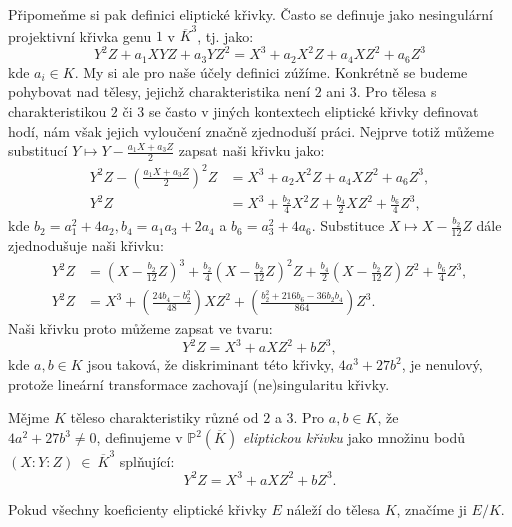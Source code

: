 \documentclass [12pt]{report}
\begin{document}
Připomeňme si pak definici eliptické křivky. Často se definuje jako nesingulární projektivní křivka genu $1$ v $\overline{K}^3$, tj. jako:
\begin{equation*}
Y^2 Z + a_1 XYZ + a_3 Y Z^2 = X^3 + a_2 X^2 Z + a_4 X Z^2 + a_6 Z^3
\end{equation*}
kde $a_i \in K$. My si ale pro naše účely definici zúžíme. Konkrétně se budeme pohybovat nad tělesy, jejichž charakteristika není $2$ ani $3$. Pro tělesa s charakteristikou $2$ či $3$ se často v jiných kontextech eliptické křivky definovat hodí, nám však jejich vyloučení značně zjednoduší práci. Nejprve totiž můžeme substitucí $Y \mapsto Y - \frac{a_1 X +a_3 Z}{2}$ zapsat naši křivku jako:
\begin{align*}
Y^2 Z -  \left(\frac{a_1 X + a_3 Z}{2}\right)^2 Z &=  X^3 + a_2 X^2 Z + a_4 X Z^2 + a_6 Z^3,\\
Y^2 Z &= X^3 + \frac{b_2}{4} X^2 Z + \frac{b_4}{2} X Z^2 + \frac{b_6}{4} Z^3,
\end{align*}
kde $b_2 = a_1 ^2 + 4 a_2, b_4 = a_1 a_3 + 2 a_4$ a $b_6 = a_3^2 + 4 a_6$. Substituce $X \mapsto X - \frac{b_2}{12} Z$ dále zjednodušuje naši křivku:
\begin{align*}
Y^2 Z &= \left( X - \frac{b_2}{12} Z\right)^3 + \frac{b_2}{4} \left( X - \frac{b_2}{12} Z\right)^2 Z + \frac{b_4}{2} \left( X - \frac{b_2}{12} Z\right) Z^2 + \frac{b_6}{4} Z^3,\\
Y^2 Z &= X^3 + \left( \frac{24 b_4 - b_2 ^2}{48} \right) X Z^2 + \left( \frac{b_2 ^2 + 216 b_6 - 36 b_2 b_4}{864} \right) Z^3.
\end{align*}
Naši křivku proto můžeme zapsat ve tvaru:
\begin{equation*}
Y^2 Z = X^3 +a X Z^2 + b Z^3,
\end{equation*}
kde $a,b \in K$ jsou taková, že diskriminant této křivky, $4a^3+27b^2$, je nenulový, protože lineární transformace zachovají (ne)singularitu křivky.

\begin{definice}
Mějme $K$ těleso charakteristiky různé od $2$ a $3$. Pro $a,b \in K$, že\\ $4a^2+27b^3 \neq 0$, definujeme v $\mathbb{P}^2 (\overline{K})$ \textit{eliptickou křivku} jako množinu bodů $(X:Y:Z)~\in~\overline{K}^3$ splňující:
\begin{equation*}
Y^2 Z = X^3 + a X Z^2 + b Z^3. 
\end{equation*}
\end{definice}


\begin{znaceni}
Pokud všechny koeficienty eliptické křivky $E$ náleží do tělesa $K$, značíme ji $E/K$.
\end{znaceni}
\end{document}
